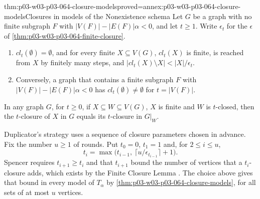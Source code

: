 \begin{hblemma}{thm:p03-w03-p03-064-closure-models}{proved=annex:p03-w03-p03-064-closure-models}{Closures in models of the Nonexistence schema}
Let \(G\) be a graph with no finite subgraph \(F\) with
\(|V(F)|-|E(F)|\alpha<0\), and let \(t\geq1\).  Write \(\epsilon_t\) for the
\(\epsilon\) of \cref{thm:p03-w03-p03-064-finite-closure}.
\begin{enumerate}
\item \(cl_t(\emptyset)=\emptyset\), and for every finite \(X\subseteq V(G)\),
  \(cl_t(X)\) is finite, is reached from \(X\) by finitely many steps, and
  \(|cl_t(X)\setminus X|<|X|/\epsilon_t\).
\item Conversely, a graph that contains a finite subgraph \(F\) with
  \(|V(F)|-|E(F)|\alpha<0\) has \(cl_t(\emptyset)\neq\emptyset\) for
  \(t=|V(F)|\).
\end{enumerate}
In any graph \(G\), for \(t\geq0\), if \(X\subseteq W\subseteq V(G)\), \(X\)
is finite and \(W\) is \(t\)-closed, then the \(t\)-closure of \(X\) in \(G\)
equals its \(t\)-closure in \(G|_W\).
\end{hblemma}

Duplicator's strategy uses a sequence of closure parameters chosen in advance.
Fix the number \(u\geq1\) of rounds.  Put \(t_0=0\), \(t_1=1\) and, for
\(2\leq i\leq u\),
\[
  t_i=\max\bigl(t_{i-1},\ \lceil u/\epsilon_{t_{i-1}}\rceil+1\bigr).
\]
Spencer requires \(t_{i+1}\geq t_i\) and that \(t_{i+1}\) bound the number of
vertices that a \(t_i\)-closure adds, which exists by the Finite Closure
Lemma \cite[p.~11]{Spencer2007LogicRandomStructuresAuthor}.  The choice above
gives that bound in every model of \(T_\alpha\) by
\cref{thm:p03-w03-p03-064-closure-models}, for all sets of at most \(u\)
vertices.

